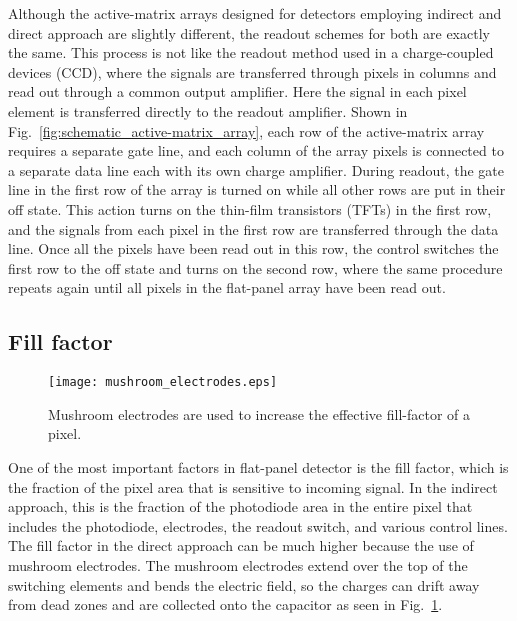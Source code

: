 Although the active-matrix arrays designed for detectors employing indirect and direct approach are slightly different, the readout schemes for both are exactly the same.  This process is not like the readout method used in a charge-coupled devices (CCD), where the signals are transferred through pixels in columns and read out through a common output amplifier.  Here the signal in each pixel element is transferred directly to the readout amplifier.  Shown in Fig.~\ref{fig:schematic_active-matrix_array}, each row of the active-matrix array requires a separate gate line, and each column of the array pixels is connected to a separate data line each with its own charge amplifier.  During readout, the gate line in the first row of the array is turned on while all other rows are put in their off state.  This action turns on the thin-film transistors (TFTs) in the first row, and the signals from each pixel in the first row are transferred through the data line.  Once all the pixels have been read out in this row, the control switches the first row to the off state and turns on the second row, where the same procedure repeats again until all pixels in the flat-panel array have been read out.  

\subsection{Fill factor}
%
%
\begin{figure}[ht]
\texttt{[image: mushroom\_electrodes.eps]}
\caption{Mushroom electrodes are used to increase the effective fill-factor of a pixel.}
\label{fig:mushroom_electrodes}
\end{figure}

One of the most important factors in flat-panel detector is the fill factor, which is the fraction of the pixel area that is sensitive to incoming signal.  In the indirect approach, this is the fraction of the photodiode area in the entire pixel that includes the photodiode, electrodes, the readout switch, and various control lines.  The fill factor in the direct approach can be much higher because the use of mushroom electrodes.  The mushroom electrodes extend over the top of the switching elements and bends the electric field, so the charges can drift away from dead zones and are collected onto the capacitor as seen in Fig.~\ref{fig:mushroom_electrodes}.

